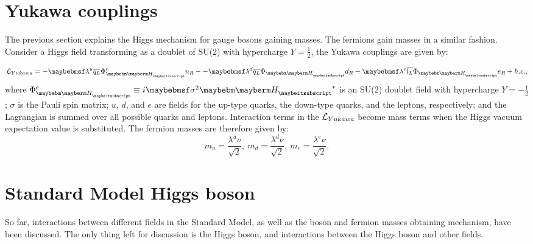 \section{Yukawa couplings}

The previous section explains the Higgs mechanism for gauge bosons gaining masses. The fermions gain masses in a similar fashion. Consider a Higgs field transforming as a doublet of SU(2) with hypercharge $Y = \frac{1}{2}$, the Yukawa couplings are given by:

\begin{equation}
\Lagr_{Yukawa} = -\lambda^{u}\overline{q_L}\Phi_{\PH}^{c}u_R - -\lambda^{d}\overline{q_L}\Phi_{\PH}{d}_R - \lambda^{e}\overline{l_L}\Phi_{\PH}e_R + h.c. ,
\end{equation}
where $\Phi_{\PH}^{c} \equiv i \sigma^2{\PH}^*$ is an SU(2) doublet field with hypercharge $Y = -\frac{1}{2}$; $\sigma$ is the Pauli spin matrix; $u$, $d$, and $e$ are fields for the up-type quarks, the down-type quarks, and the leptons, respectively; and the Lagrangian is summed over all possible quarks and leptons. Interaction terms in the $\operatorname{\mathcal{L}}_{Yukawa}$ become mass terms when the Higgs vacuum expectation value is substituted. The fermion masses are therefore given by:
\begin{equation}
m_{u} = \frac{\lambda^u{\nu}}{\sqrt{2}},\ m_{d} = \frac{\lambda^d{\nu}}{\sqrt{2}},\ m_{e} = \frac{\lambda^e{\nu}}{\sqrt{2}}.
\end{equation}

\section{Standard Model Higgs boson}
\label{sec:theoryHiggsBoson}

So far, interactions between different fields in the Standard Model, as well as the boson and fermion masses obtaining mechanism, have been discussed. The only thing left for discussion is the Higgs boson, and  interactions between the Higgs boson and other fields.

